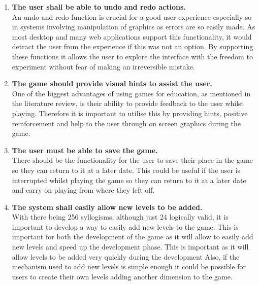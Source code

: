 \documentclass[12pt,a4paper]{report}
\begin{document}
\begin{enumerate}[label*=\arabic*]
            
            	  \item \textbf{The user shall be able to undo and redo actions.}\\
An undo and redo function is crucial for a good user experience especially so in systems involving manipulation of graphics as errors are so easily made. As most desktop and many web applications support this functionality, it would detract the user from the experience if this was not an option. By supporting these functions it allows the user to explore the interface with the freedom to experiment without fear of making an irreversible mistake. 
            
            
            	  \item \textbf{The game should provide visual hints to assist the user.}\\
One of the biggest advantages of using games for education, as mentioned in the literature review, is their ability to provide feedback to the user whilst playing. Therefore it is important to utilise this by providing hints, positive reinforcement and help to the user through on screen graphics during the game.

            	  \item \textbf{The user must be able to save the game.}\\
There should be the functionality for the user to save their place in the game so they can return to it at a later date. This could be useful if the user is interrupted whilst playing the game so they can return to it at a later date and carry on playing from where they left off.
            
                        	  \item \textbf{The system shall easily allow new levels to be added.}\\
With there being 256 syllogisms, although just 24 logically valid, it is important to develop a way to easily add new levels to the game. This is important for both the development of the game as it will allow to easily add new levels and speed up the development phase. This is important as it will allow levels to be added very quickly during the development Also, if the mechanism used to add new levels is simple enough it could be possible for users to create their own levels adding another dimension to the game.

            
            
        \end{enumerate}
        
\end{document}
